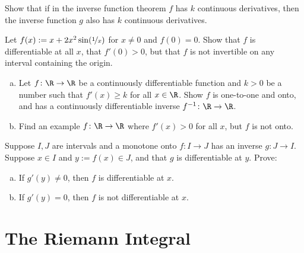 \documentclass[12pt]{book}
\begin{document}
\begin{exercise}
Show that if in the inverse function theorem $f$ has $k$ continuous
derivatives, then the inverse function $g$ also has $k$ continuous
derivatives.
\end{exercise}

\begin{exercise}
Let $f(x) := x + 2 x^2 \sin(\nicefrac{1}{x})$ for $x \not= 0$ and
$f(0) = 0$.
Show that $f$ is differentiable at all $x$, that $f'(0) > 0$,
but that $f$ is not invertible
on any interval containing the origin.
\end{exercise}

\begin{exercise}
\begin{enumerate}[a)]
 \item Let $f \colon \R \to \R$ be a continuously differentiable function
and $k > 0$ be a number such that $f'(x) \geq k$ for all $x \in \R$.
Show $f$ is one-to-one and onto, and has a continuously differentiable
inverse $f^{-1} \colon \R \to \R$. 
 \item Find an example $f \colon \R \to \R$
where $f'(x) > 0$
for all $x$, but $f$ is not onto.
\end{enumerate}
\end{exercise}

\begin{exercise}
Suppose $I,J$ are intervals and a monotone onto $f \colon I \to J$ has an inverse $g \colon J \to I$.
Suppose $x \in I$ and $y := f(x) \in J$, and that $g$ is differentiable at
$y$.
Prove:
\begin{enumerate}[a)]
 \item If $g'(y) \not= 0$, then $f$ is differentiable at $x$.
  \item If $g'(y) = 0$, then $f$ is not differentiable at $x$.
\end{enumerate}
\end{exercise}



\chapter{The Riemann Integral} \label{int:chapter}

\end{document}
